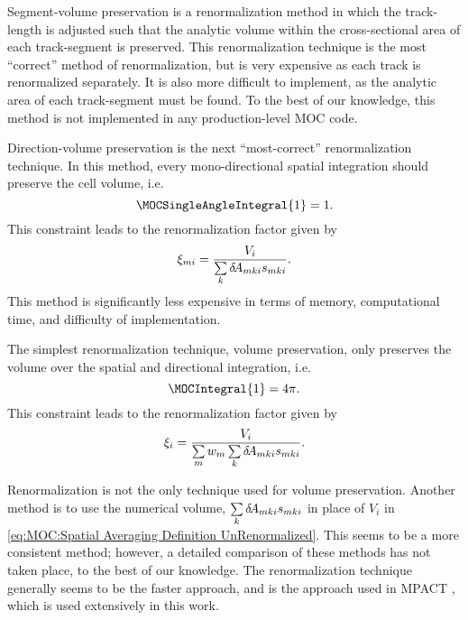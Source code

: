 {{{            Segment-volume preservation is a renormalization method in which the track-length is adjusted such that the analytic volume within the cross-sectional area of each track-segment is preserved.
            This renormalization technique is the most ``correct'' method of renormalization, but is very expensive as each track is renormalized separately.
            It is also more difficult to implement, as the analytic area of each track-segment must be found.
            To the best of our knowledge, this method is not implemented in any production-level \ac{MOC} code.

            Direction-volume preservation is the next ``most-correct'' renormalization technique.
            In this method, every mono-directional spatial integration should preserve the cell volume, i.e.
            \begin{equation}\label{eq:MOC:Angle-Volume Preservation}
                \MOCSingleAngleIntegral{1} = 1.
            \end{equation}
            This constraint leads to the renormalization factor given by
            \begin{equation}\label{eq:MOC:Direction-Dependent Renormalization}
                \renorm[mi] = \frac{V_i}{\suml[k]\tA[mki]\segl}.
            \end{equation}
            This method is significantly less expensive in terms of memory, computational time, and difficulty of implementation.

            The simplest renormalization technique, volume preservation, only preserves the volume over the spatial and directional integration, i.e.
            \begin{equation}\label{eq:MOC:Volume Preservation}
                \MOCIntegral{1} = \fourpi.
            \end{equation}
            This constraint leads to the renormalization factor given by
            \begin{equation}\label{eq:MOC:Region Renormalization}
                \renorm[i] = \frac{V_i}{\suml[m]\wt[m]\suml[k]\tA[mki]\segl}.
            \end{equation}

            Renormalization is not the only technique used for volume preservation.
            Another method is to use the numerical volume, $\suml[k]\tA[mki]\segl$ in place of $V_i$ in \cref{eq:MOC:Spatial Averaging Definition UnRenormalized}.
            This seems to be a more consistent method; however, a detailed comparison of these methods has not taken place, to the best of our knowledge.
            The renormalization technique generally seems to be the faster approach, and is the approach used in MPACT \cite{Collins2016}, which is used extensively in this work.
        }
    }
}
